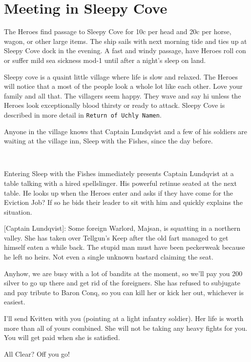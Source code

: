 \section*{Meeting in Sleepy Cove}
The Heroes find passage to Sleepy Cove for 10c per head and 20c per horse, wagon, or other large items. The ship sails with next morning tide and ties up at Sleepy Cove dock in the evening. A fast and windy passage, have Heroes roll con or suffer mild sea sickness mod-1 until after a night's sleep on land.

Sleepy cove is a quaint little village where life is slow and relaxed. The Heroes will notice that a most of the people look a whole lot like each other. Love your family and all that. The villagers seem happy. They wave and say hi unless the Heroes look exceptionally blood thirsty or ready to attack. Sleepy Cove is described in more detail in \texttt{Return of Uchly Namen}.

Anyone in the village knows that Captain Lundqvist and a few of his soldiers are waiting at the village inn, Sleep with the Fishes, since the day before.

\

Entering Sleep with the Fishes immediately presents Captain Lundqvist at a table talking with a hired spellslinger. His powerful retinue seated at the next table. He looks up when the Heroes enter and asks if they have come for the Eviction Job? If so he bids their leader to sit with him and quickly explains the situation.

\begin{readoutloud}

[Captain Lundqvist]: Some foreign Warlord, Majsan, is squatting in a northern valley. She has taken over Tellgun's Keep after the old fart managed to get himself eaten a while back. The stupid man must have been peckerweak because he left no heirs. Not even a single unknown bastard claiming the seat.

Anyhow, we are busy with a lot of bandits at the moment, so we'll pay you 200 silver to go up there and get rid of the foreigners. She has refused to subjugate and pay tribute to Baron Conq, so you can kill her or kick her out, whichever is easiest.

I'll send Kvitten with you (pointing at a light infantry soldier). Her life is worth more than all of yours combined. She will not be taking any heavy fights for you.
You will get paid when she is satisfied.

All Clear? Off you go!

\end{readoutloud}

